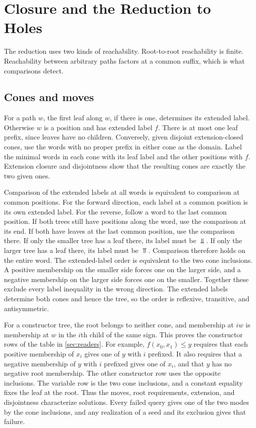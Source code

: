 \section{Closure and the Reduction to Holes}
\label{app:reduction}

The reduction uses two kinds of reachability. Root-to-root reachability
is finite. Reachability between arbitrary paths factors at a common
suffix, which is what comparisons detect.

\subsection{Cones and moves}

For a path $w$, the first leaf along $w$, if there is one, determines
its extended label. Otherwise $w$ is a position and has extended label
$f$. There is at most one leaf prefix, since leaves have no children.
Conversely, given disjoint extension-closed cones, use the words with no
proper prefix in either cone as the domain. Label the minimal words in
each cone with its leaf label and the other positions with $f$.
Extension closure and disjointness show that the resulting cones are
exactly the two given ones.

Comparison of the extended labels at all words is equivalent to
comparison at common positions. For the forward direction, each label
at a common position is its own extended label. For the reverse,
follow a word to the last common position. If both trees still have
positions along the word, use the comparison at its end. If both
have leaves at the last common position, use the comparison there.
If only the smaller tree has a leaf there, its label must be $\Bot$.
If only the larger tree has a leaf there, its label must be $\Top$.
Comparison therefore holds on the entire word. The extended-label
order is equivalent to the two cone inclusions. A positive
membership on the smaller side forces one on the larger side, and
a negative membership on the larger side forces one on the smaller.
Together these exclude every label inequality in the wrong direction.
The extended labels determine both cones and hence the tree, so the
order is reflexive, transitive, and antisymmetric.

For a constructor tree, the root belongs to neither cone, and membership
at $iw$ is membership at $w$ in the $i$th child of the same sign.
This proves the constructor rows of the table in \cref{sec:readers}.
For example, $f(x_0,x_1)\le y$ requires that each positive membership
of $x_i$ gives one of $y$ with $i$ prefixed. It also requires that a
negative membership of $y$ with $i$ prefixed gives one of $x_i$, and
that $y$ has no negative root membership. The other constructor row
uses the opposite inclusions. The variable row is the two cone
inclusions, and a constant equality fixes the leaf at the root.
Thus the moves, root requirements, extension, and disjointness
characterize solutions.
Every failed query gives one of the two modes by the cone inclusions,
and any realization of a seed and its exclusion gives that failure.

